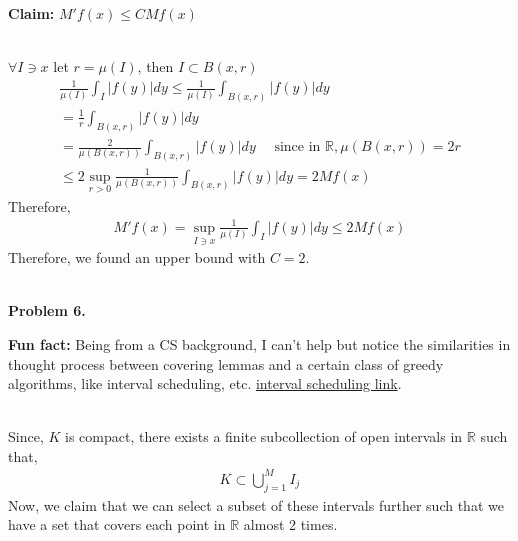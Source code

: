 \documentclass{article}
\newcommand{\R}{\mathbb{R}}
\begin{document}
\textbf{Claim: } $M'f(x) \leq C Mf(x)$
\\~

$\forall I \ni x$ let $r = \mu(I)$, then $I \subset B(x,r)$
\begin{gather*}
    \frac{1}{\mu(I)} \int_{I} |f(y)|dy \leq \frac{1}{\mu(I)} \int_{B(x,r)} |f(y)|dy \\
    = \frac{1}{r} \int_{B(x,r)} |f(y)|dy \\
    = \frac{2}{\mu(B(x, r))} \int_{B(x,r)} |f(y)|dy  \quad \text{ since in } \R, \mu(B(x, r)) = 2r\\
    \leq 2 \sup_{r > 0} \frac{1}{\mu(B(x,r))} \int_{B(x,r)} |f(y)|dy = 2 Mf(x)
\end{gather*}
Therefore,
\begin{gather*}
    M'f(x) = \sup_{I\ni x} \frac{1}{\mu(I)} \int_{I} |f(y)|dy \leq 2 Mf(x)
\end{gather*}
Therefore, we found an upper bound with $C = 2$.
\\~

\textbf{Problem 6. }

\textbf{Fun fact: } Being from a CS background, I can't help but notice the similarities in thought process between covering lemmas and a certain class of greedy algorithms, like interval scheduling, etc. \href{https://www.cs.princeton.edu/~wayne/kleinberg-tardos/pearson/04GreedyAlgorithms-2x2.pdf}{interval scheduling link}.
\\~


Since, $K$ is compact, there exists a finite subcollection of open intervals in $\R$ such that,
\begin{gather*}
    K \subset \bigcup_{j=1}^{M} I_j
\end{gather*}
Now, we claim that we can select a subset of these intervals further such that we have a set that covers each point in $\R$ almost 2 times.
\end{document}
